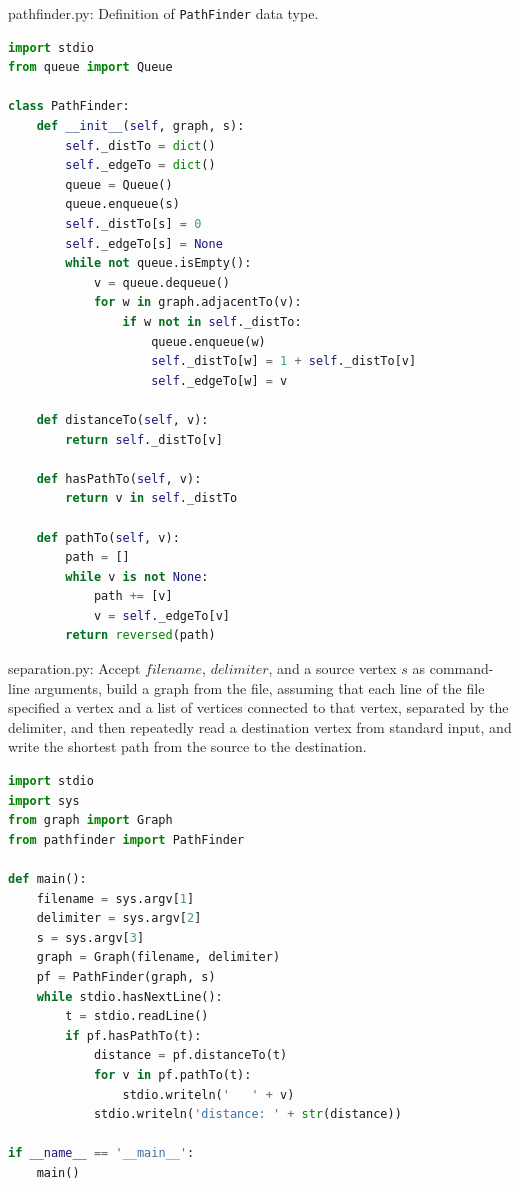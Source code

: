 \documentclass[8pt,a4paper,compress]{beamer}
\begin{document}
\begin{frame}[fragile]
\pause

\begin{framed}
\tiny pathfinder.py: Definition of \lstinline{PathFinder} data type.
\end{framed}

\begin{lstlisting}[language=python,style=focusin]
import stdio
from queue import Queue

class PathFinder:
    def __init__(self, graph, s):
        self._distTo = dict()
        self._edgeTo = dict()
        queue = Queue()
        queue.enqueue(s)
        self._distTo[s] = 0
        self._edgeTo[s] = None
        while not queue.isEmpty():
            v = queue.dequeue()
            for w in graph.adjacentTo(v):
                if w not in self._distTo:
                    queue.enqueue(w)
                    self._distTo[w] = 1 + self._distTo[v]
                    self._edgeTo[w] = v
    
    def distanceTo(self, v):
        return self._distTo[v]
        
    def hasPathTo(self, v):
        return v in self._distTo

    def pathTo(self, v):
        path = []
        while v is not None:
            path += [v]
            v = self._edgeTo[v]
        return reversed(path)
\end{lstlisting}
\end{frame}

\begin{frame}[fragile]
\pause

\begin{framed}
\tiny separation.py: Accept $filename$, $delimiter$, and a source vertex $s$ as command-line arguments, build a graph from the file, assuming that each line of the file specified a vertex and a list of vertices connected to that vertex, separated by the delimiter, and then repeatedly read a destination vertex from standard input, and write the shortest path from the source to the destination.
\end{framed}

\begin{lstlisting}[language=python,style=focusin]
import stdio
import sys
from graph import Graph
from pathfinder import PathFinder

def main():
    filename = sys.argv[1]
    delimiter = sys.argv[2]
    s = sys.argv[3]
    graph = Graph(filename, delimiter)
    pf = PathFinder(graph, s)
    while stdio.hasNextLine():
        t = stdio.readLine()
        if pf.hasPathTo(t):
            distance = pf.distanceTo(t)
            for v in pf.pathTo(t):
                stdio.writeln('   ' + v)
            stdio.writeln('distance: ' + str(distance))

if __name__ == '__main__':
    main()
\end{lstlisting}
\end{frame}
\end{document}
